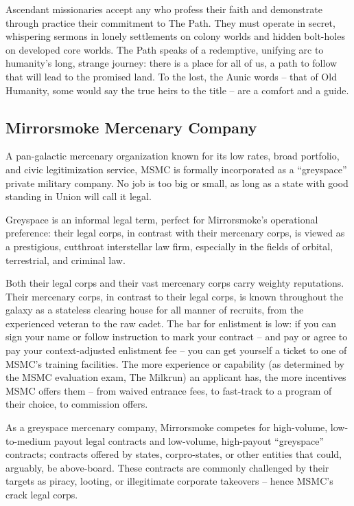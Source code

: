 Ascendant missionaries accept any who profess their faith and demonstrate through practice
their commitment to The Path. They must operate in secret, whispering sermons in lonely
settlements on colony worlds and hidden bolt-holes on developed core worlds. The Path speaks
of a redemptive, unifying arc to humanity’s long, strange journey: there is a place for all of us, a
path to follow that will lead to the promised land. To the lost, the Aunic words -- that of Old
Humanity, some would say the true heirs to the title -- are a comfort and a guide.

\subsection{Mirrorsmoke Mercenary Company}

A pan-galactic mercenary organization known for its low rates, broad portfolio, and civic
legitimization service, MSMC is formally incorporated as a “greyspace” private military company.
No job is too big or small, as long as a state with good standing in Union will call it legal.

Greyspace is an informal legal term, perfect for Mirrorsmoke’s operational preference: their legal
corps, in contrast with their mercenary corps, is viewed as a prestigious, cutthroat interstellar law
firm, especially in the fields of orbital, terrestrial, and criminal  law.

Both their legal corps and their vast mercenary corps carry weighty reputations. Their mercenary
corps, in contrast to their legal corps, is known throughout the galaxy as a stateless clearing
house for all manner of recruits, from the experienced veteran to the raw cadet. The bar for
enlistment is low: if you can sign your name or follow instruction to mark your contract -- and
pay or agree to pay your context-adjusted enlistment fee -- you can get yourself a ticket to one
of MSMC’s training facilities. The more experience or capability (as determined by the MSMC
evaluation exam, The Milkrun) an applicant has, the more incentives MSMC offers them -- from
waived entrance fees, to fast-track to a program of their choice, to commission offers.

As a greyspace mercenary company, Mirrorsmoke competes for high-volume, low-to-medium
payout legal contracts and low-volume, high-payout “greyspace” contracts; contracts offered by
states, corpro-states, or other entities that could, arguably, be above-board. These contracts are
commonly challenged by their targets as piracy, looting, or illegitimate corporate takeovers --
hence MSMC’s crack legal corps.

